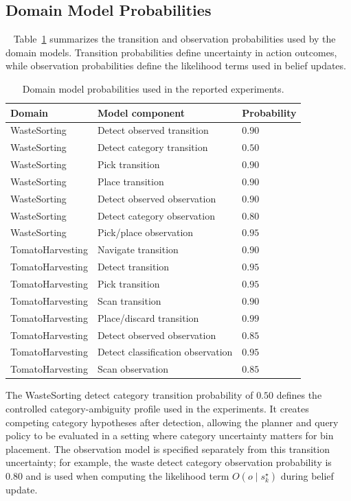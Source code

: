 \subsection{Domain Model Probabilities}~\label{appx:model_params}
Table~\ref{tab:app_model_params} summarizes the transition and observation probabilities used by the domain models. Transition probabilities define uncertainty in action outcomes, while observation probabilities define the likelihood terms used in belief updates.

\begin{table}[h]
\centering
\caption{Domain model probabilities used in the reported experiments.}
\label{tab:app_model_params}
\small
\begin{tabular}{lll}
\toprule
\textbf{Domain} & \textbf{Model component} & \textbf{Probability} \\
\midrule
WasteSorting & Detect observed transition & $0.90$ \\
WasteSorting & Detect category transition & $0.50$ \\
WasteSorting & Pick transition & $0.90$ \\
WasteSorting & Place transition & $0.90$ \\
WasteSorting & Detect observed observation & $0.90$ \\
WasteSorting & Detect category observation & $0.80$ \\
WasteSorting & Pick/place observation & $0.95$ \\
\midrule
TomatoHarvesting & Navigate transition & $0.90$ \\
TomatoHarvesting & Detect transition & $0.95$ \\
TomatoHarvesting & Pick transition & $0.95$ \\
TomatoHarvesting & Scan transition & $0.90$ \\
TomatoHarvesting & Place/discard transition & $0.99$ \\
TomatoHarvesting & Detect observed observation & $0.85$ \\
TomatoHarvesting & Detect classification observation & $0.95$ \\
TomatoHarvesting & Scan observation & $0.85$ \\
\bottomrule
\end{tabular}
\end{table}

The WasteSorting detect category transition probability of $0.50$ defines the controlled category-ambiguity profile used in the experiments. It creates competing category hypotheses after detection, allowing the planner and query policy to be evaluated in a setting where category uncertainty matters for bin placement. The observation model is specified separately from this transition uncertainty; for example, the waste detect category observation probability is $0.80$ and is used when computing the likelihood term $O(o \mid s_k^{\star})$ during belief update.

